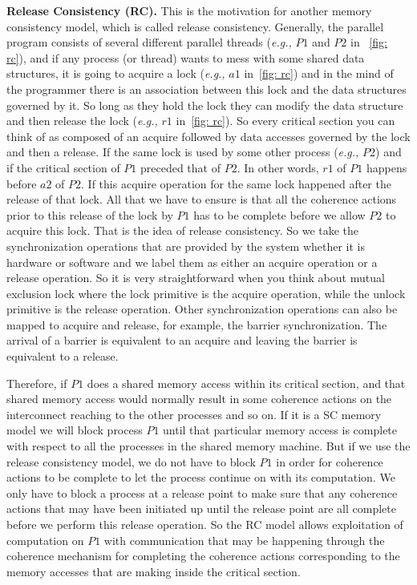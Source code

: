 \documentclass[11pt]{lecture}
\begin{document}
\noindent
{\bf Release Consistency (RC).} This is the motivation for another memory consistency model, which is called 
release consistency. Generally, the parallel program consists of several different parallel threads 
({\it e.g.,} $P1$ and $P2$ in ~\autoref{fig: rc}), and if any process (or thread) wants to mess with some shared data 
structures, it is going to acquire a lock ({\it e.g.,} $a1$ in~\autoref{fig: rc}) and in the mind of the programmer 
there is an association between this lock and the data structures governed by it. So long as they hold 
the lock they can modify the data structure and then release the lock ({\it e.g.,} $r1$ in~\autoref{fig: rc}). So 
every critical section you can think of as composed of an acquire followed by data accesses governed 
by the lock and then a release. If the same lock is used by some other process ({\it e.g.,} $P2$) and 
if the critical section of $P1$ preceded that of $P2$. In other words, $r1$ of $P1$ happens before 
$a2$ of $P2$. If this acquire operation for the same lock happened after the release of that lock. 
All that we have to ensure is that all the coherence actions prior to this 
release of the lock by $P1$ has to be complete before we allow $P2$ to acquire this lock. That is 
the idea of release consistency. So we take the synchronization operations that are provided 
by the system whether it is hardware or software and we label them as either an acquire operation 
or a release operation. So it is very straightforward when you think about mutual exclusion lock 
where the lock primitive is the acquire operation, while the unlock primitive is the release 
operation. Other synchronization operations can also be mapped to acquire and release, for example, 
the barrier synchronization. The arrival of a barrier is equivalent to an acquire and leaving the 
barrier is equivalent to a release. 

Therefore, if $P1$ does a shared memory access within its critical section, and that shared memory access 
would normally result in some coherence actions on the interconnect reaching to the other processes 
and so on. If it is a SC memory model we will block process $P1$ until that particular memory access 
is complete with respect to all the processes in the shared memory machine. But if we use the release consistency 
model, we do not have to block $P1$ in order for coherence actions to be complete to let the process 
continue on with its computation. We only have to block a process at a release point to make 
sure that any coherence actions that may have been initiated up until the release point are all complete 
before we perform this release operation. So the RC model allows exploitation of computation on $P1$ 
with communication that may be happening through the coherence mechanism for completing the 
coherence actions corresponding to the memory accesses that are making inside the critical section. 
\end{document}
